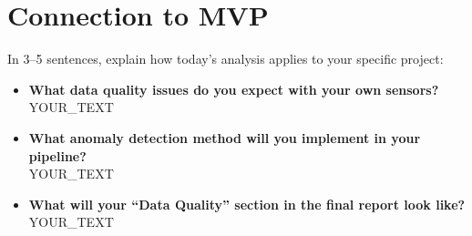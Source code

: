 \documentclass[11pt,a4paper]{article}
\begin{document}
\section{Connection to MVP}

In 3--5 sentences, explain how today's analysis applies to your specific project:

\begin{itemize}[leftmargin=*]
  \item \textbf{What data quality issues do you expect with your own sensors?}\\
  YOUR\_TEXT

  \item \textbf{What anomaly detection method will you implement in your pipeline?}\\
  YOUR\_TEXT

  \item \textbf{What will your ``Data Quality'' section in the final report look like?}\\
  YOUR\_TEXT
\end{itemize}
\end{document}
